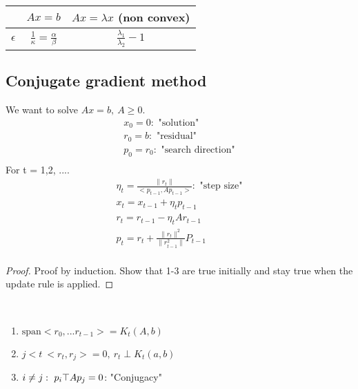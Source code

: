 \documentclass[12pt]{article}
\begin{document}
\begin{center}
\begin{tabular}{ | c |c| c | } 
\hline
 & $Ax=b$ & $Ax=\lambda x$ (non convex) \\ 
\hline
$\epsilon$ & $\frac{1}{\kappa} = \frac{\alpha}{\beta}$ & $\frac{\lambda_1}{\lambda_2} -1$ \\ 
\hline
\end{tabular}
\end{center}


\subsection{Conjugate gradient method}
We want to solve $Ax = b, \ A \geq 0$. 
\begin{align*}
x_0 = 0: \text{ "solution"} \\
r_0 = b: \text{ "residual"} \\
p_0 = r_0: \text{ "search direction"} \\
\end{align*}
For t = 1,2, ....
\begin{align*}
\eta_t = \frac{\|r_t\|}{<p_{t-1}, Ap_{t-1}>}: \text{ "step size"} \\
x_t = x_{t-1} + \eta_t p_{t-1} \\
r_t = r_{t-1} - \eta_t A r_{t-1} \\
p_t = r_t + \frac{\|r_t\|^2}{\|r_{t-1}^2\|}P_{t-1} \\ 
\end{align*}
\begin{proof}
Proof by induction. Show that 1-3 are true initially and stay true when the update rule is applied.  
\end{proof}
\begin{lemma} \ \\
\begin{enumerate}
\item $\text{span}<r_0, ...r_{t-1}> = K_t(A,b)$
\item $j<t \ <r_t, r_j> = 0, \ r_t \perp K_t(a,b)$
\item $i \neq j: \ p_i\top A p_j = 0$: "Conjugacy" 
\end{enumerate}
\end{lemma}
\end{document}
